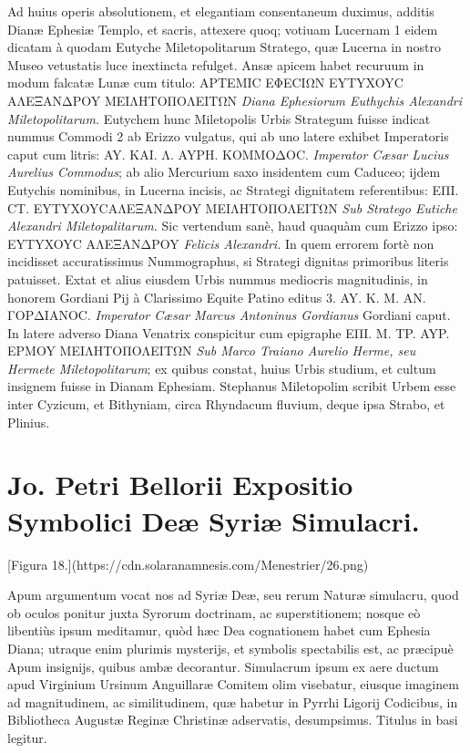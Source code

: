 \documentclass[a4paper, 11pt, oneside, polutonikogreek, latin]{article}
\begin{document}
Ad huius operis absolutionem, et elegantiam consentaneum duximus, additis Dianæ Ephesiæ Templo, et sacris, attexere quoq; votiuam Lucernam 1 eidem dicatam à quodam Eutyche Miletopolitarum Stratego, quæ Lucerna in nostro Museo vetustatis luce inextincta refulget. Ansæ apicem habet recuruum in modum falcatæ Lunæ cum titulo: APTEMIC EΦECIΩN EYTYXOYC AΛEΞANΔPOY MEIΛHTOΠOΛEITΩN \emph{Diana Ephesiorum Euthychis Alexandri Miletopolitarum.} Eutychem hunc Miletopolis Urbis Strategum fuisse indicat nummus Commodi 2 ab Erizzo vulgatus, qui ab uno latere exhibet Imperatoris caput cum litris: AY. KAI. Λ. AYPH. KOMMOΔOC. \emph{Imperator Cæsar Lucius Aurelius Commodus}; ab alio Mercurium saxo insidentem cum Caduceo; ijdem Eutychis nominibus, in Lucerna incisis, ac Strategi dignitatem referentibus: EΠI. CT. EYTYXOYCAΛEΞANΔPOY MEIΛHTOΠOΛEITΩN \emph{Sub Stratego Eutiche Alexandri Miletopalitarum.} Sic vertendum sanè, haud quaquàm cum Erizzo ipso: EYTYXOYC AΛEΞANΔPOY \emph{Felicis Alexandri.} In quem errorem fortè non incidisset accuratissimus Nummographus, si Strategi dignitas primoribus literis patuisset. Extat et alius eiusdem Urbis nummus mediocris magnitudinis, in honorem Gordiani Pij à Clarissimo Equite Patino editus 3. AY. K. M. AN. ΓOPΔIANOC. \emph{Imperator Cæsar Marcus Antoninus Gordianus} Gordiani caput. In latere adverso Diana Venatrix conspicitur cum epigraphe EΠI. M. TP. AYP. EPMOY MEIΛHTOΠOΛEITΩN \emph{Sub Marco Traiano Aurelio Herme, seu Hermete Miletopolitarum}; ex quibus constat, huius Urbis studium, et cultum insignem fuisse in Dianam Ephesiam. Stephanus Miletopolim scribit Urbem esse inter Cyzicum, et Bithyniam, circa Rhyndacum fluvium, deque ipsa Strabo, et Plinius.
\clearpage
\section{Jo. Petri Bellorii Expositio Symbolici Deæ Syriæ Simulacri.}

[Figura 18.](https://cdn.solaranamnesis.com/Menestrier/26.png)

Apum argumentum vocat nos ad Syriæ Deæ, seu rerum Naturæ simulacru, quod ob oculos ponitur juxta Syrorum doctrinam, ac superstitionem; nosque eò libentiùs ipsum meditamur, quòd hæc Dea cognationem habet cum Ephesia Diana; utraque enim plurimis mysterijs, et symbolis spectabilis est, ac præcipuè Apum insignijs, quibus ambæ decorantur. Simulacrum ipsum ex aere ductum apud Virginium Ursinum Anguillaræ Comitem olim visebatur, eiusque imaginem ad magnitudinem, ac similitudinem, quæ habetur in Pyrrhi Ligorij Codicibus, in Bibliotheca Augustæ Reginæ Christinæ adservatis, desumpsimus. Titulus in basi legitur.
\end{document}
